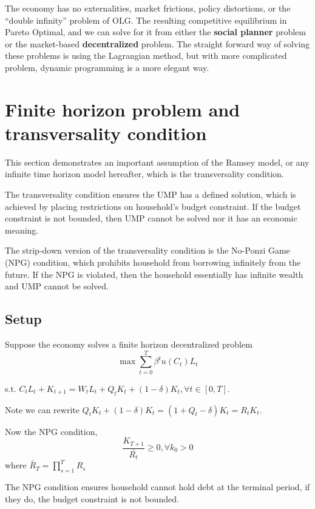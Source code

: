 \documentclass[twocolumn, fleqn]{article}
\begin{document}
		\begin{note}
			The economy has no externalities, market frictions, policy distortions, or the ``double infinity''
			problem of OLG.
			The resulting competitive equilibrium in Pareto Optimal, and we can solve for it from either the \textbf{social
			planner} problem or the market-based \textbf{decentralized} problem.
			The straight forward way of solving these problems is using the Lagrangian method, but with more
			complicated problem, dynamic programming is a more elegant way.
		\end{note}

	\section{Finite horizon problem and transversality condition}
		\label{sec:finite-time-problem-and-transversality-condition}
		This section demonstrates an important assumption of the Ramsey model, or any infinite time horizon model
		hereafter, which is the transversality condition.

		The transversality condition ensures the UMP has a defined solution, which is achieved by placing
		restrictions on household's budget constraint.
		If the budget constraint is not bounded, then UMP cannot be solved nor it has an economic meaning.

		The strip-down version of the transversality condition is the No-Ponzi Game (NPG) condition, which prohibits
		household from borrowing infinitely from the future.
		If the NPG is violated, then the household essentially has infinite wealth and UMP cannot be solved.

		\subsection{Setup}\label{subsec:setup}
			Suppose the economy solves a finite horizon decentralized problem
			\[\max \sum_{t=0}^{T} \beta^t u(C_t)L_t \]

			s.t. $C_t L_t + K_{t+1}= W_t L_t + Q_t K_t + (1-\delta)K_t, \forall t \in [0,T]$.

			Note we can rewrite $Q_t K_t + (1-\delta)K_t = (1+Q_t -\delta)K_t = R_t K_t$.

			Now the NPG condition, \[\frac{K_{T+1}}{\bar{R_t}}\geq 0, \forall k_0 >0\]
			where $\bar{R}_T = \prod_{s=1}^T R_s$

			The NPG condition ensures household cannot hold debt at the terminal period, if they do, the budget
			constraint is not bounded.
\end{document}
